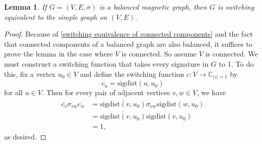 \documentclass[12pt]{article}
\newtheorem{lem}[thm]{Lemma}
\theoremstyle{definition}
\newcommand{\C}{\mathbb C}
\begin{document}
\begin{lem}\label{balanced implies switching equivalent to simple graph}
If $G=(V, E, \sigma)$ is a balanced magnetic graph, then $G$ is switching equivalent to the simple graph on $(V, E)$.
\end{lem}
\begin{proof}
Because of \cref{switching equivalence of connected components} and the fact that connected components of a balanced graph are also balanced, it suffices to prove the lemma in the case where $V$ is connected. So assume $V$ is connected. We must construct a switching function that takes every signature in $G$ to 1. To do this, fix a vertex $u_0 \in V$ and define the switching function $c: V \rightarrow \C_{|z|=1}$ by 
$$c_u = \text{sigdist} (u, u_0)$$
for all $u \in V$. Then for every pair of adjacent vertices $v, w \in V$, we have
\begin{align*}
\overline{c_v} \sigma_{vw} c_w
&= \overline{\text{sigdist} (v, u_0)} \sigma_{vw} \text{sigdist} (w, u_0) \\
&= \overline{\text{sigdist} (v, u_0)} \text{sigdist} (v, u_0) \\
&= 1,
\end{align*}
as desired.
\end{proof}
\end{document}
